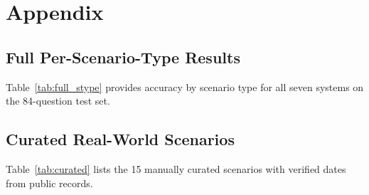 \section{Appendix}

\subsection{Full Per-Scenario-Type Results}

Table~\ref{tab:full_stype} provides accuracy by scenario type for all seven systems on the 84-question test set.

\begin{table}[h]
\centering
{}
\caption{Accuracy by scenario type (test set, 84 questions). Naive RAG results are identical to FAISS and Simple KG.}
\label{tab:full_stype}
\end{table}

\subsection{Curated Real-World Scenarios}

Table~\ref{tab:curated} lists the 15 manually curated scenarios with verified dates from public records.

